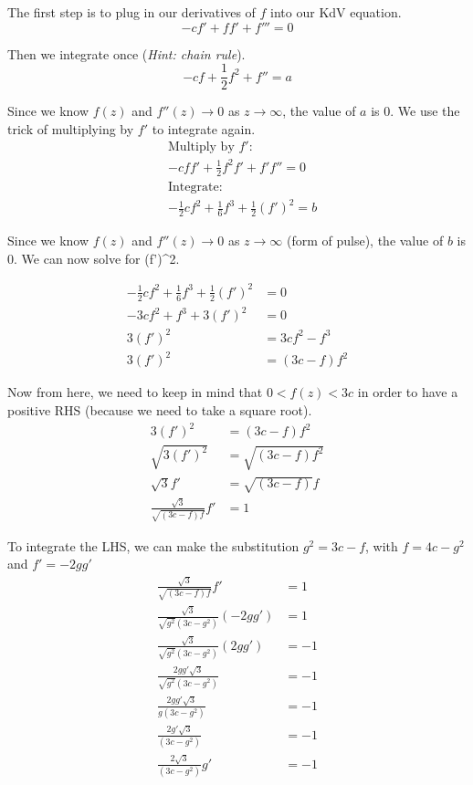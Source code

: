 \documentclass[12pt, letterpaper]{article}
\begin{document}
    The first step is to plug in our derivatives of $f$ into our KdV equation.
    \[
        -cf' + ff' + f{'''} = 0
    \]

    Then we integrate once (\textit{Hint: chain rule}).
    \[
        -cf + \frac{1}{2} f^2 + f{''} = a
    \]


    Since we know $f(z)$ and $f''(z) \rightarrow 0$ as $z \rightarrow \infty$, the value of $a$ is 0.
    We use the trick of multiplying by $f'$ to integrate again.
    \begin{align*}
            &\text{Multiply by } f': \\
            &-c f f' + \frac{1}{2} f^2 f' + f' f'' = 0 \\
            &\text{Integrate}: \\
            &-\frac{1}{2} c f^2 + \frac{1}{6} f^3 + \frac{1}{2} (f')^2 =b
    \end{align*}

    Since we know $f(z)$ and $f''(z) \rightarrow 0$ as $z \rightarrow \infty$ (form of pulse), the value of $b$ is 0.
    We can now solve for (f')^2.

    \begin{align*}
        -\frac{1}{2} c f^2 + \frac{1}{6} f^3 + \frac{1}{2} (f')^2 &= 0 \\
        - 3c f^2 + f^3 + 3 (f')^2 &= 0 \\
        3 (f')^2 &= 3c f^2 - f^3 \\
        3 (f')^2 &= (3c - f)f^2
    \end{align*}

    Now from here, we need to keep in mind that $0<f(z)<3c$ in order to have a positive RHS (because
    we need to take a square root).
    \begin{align*}
        3 (f')^2 &= (3c - f)f^2\\
        \sqrt{3 (f')^2} &= \sqrt{(3c - f)f^2}\\
        \sqrt{3}f' &= \sqrt{(3c - f)}f\\
        \frac{\sqrt{3}}{\sqrt{(3c - f)f}} f' &= 1
    \end{align*}

    To integrate the LHS, we can make the substitution $g^2 = 3c-f$, with $f=4c-g^2$ and $f' = -2gg'$
    \begin{align*}
        \frac{\sqrt{3}}{\sqrt{(3c - f)f}} f' &= 1\\
        \frac{\sqrt{3}}{\sqrt{g^2} (3c-g^2) } (-2gg') &= 1\\
        \frac{\sqrt{3}}{\sqrt{g^2} (3c-g^2) } (2gg') &= -1\\
        \frac{2gg' \sqrt{3}}{\sqrt{g^2} (3c-g^2) } &= -1\\
        \frac{2gg' \sqrt{3}}{g (3c-g^2) } &= -1\\
        \frac{2g' \sqrt{3}}{ (3c-g^2) } &= -1\\
        \frac{2 \sqrt{3}}{ (3c-g^2) } g' &= -1
    \end{align*}
\end{document}
